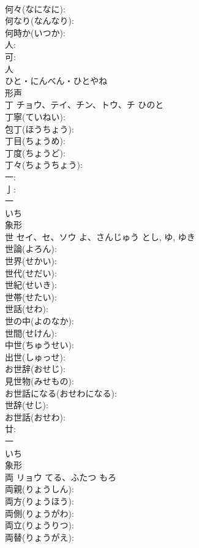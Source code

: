 \documentclass[8pt]{extreport}
\begin{document}
\begin{CJK}{UTF8}{min}
\\	何々(なになに): 
\\	何なり(なんなり): 
\\	何時か(いつか): 
\\	人: 
\\	可: 
\\	人	
\\	ひと・にんべん・ひとやね	
\\	形声 
\\	丁	チョウ、テイ、チン、トウ、チ	ひのと		
\\	丁寧(ていねい): 
\\	包丁(ほうちょう): 
\\	丁目(ちょうめ): 
\\	丁度(ちょうど): 
\\	丁々(ちょうちょう): 
\\	一: 
\\	亅: 
\\	一	
\\	いち	
\\	象形 
\\	世	セイ、セ、ソウ	よ、さんじゅう	とし, ゆ, ゆき	
\\	世論(よろん): 
\\	世界(せかい): 
\\	世代(せだい): 
\\	世紀(せいき): 
\\	世帯(せたい): 
\\	世話(せわ): 
\\	世の中(よのなか): 
\\	世間(せけん): 
\\	中世(ちゅうせい): 
\\	出世(しゅっせ): 
\\	お世辞(おせじ): 
\\	見世物(みせもの): 
\\	お世話になる(おせわになる): 
\\	世辞(せじ): 
\\	お世話(おせわ): 
\\	廿: 
\\	一	
\\	いち	
\\	象形 
\\	両	リョウ	てる、ふたつ	もろ	
\\	両親(りょうしん): 
\\	両方(りょうほう): 
\\	両側(りょうがわ): 
\\	両立(りょうりつ): 
\\	両替(りょうがえ): 

\end{CJK}
\end{document}
